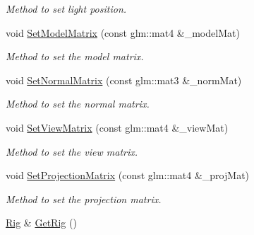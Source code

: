 \begin{DoxyCompactItemize}
\begin{DoxyCompactList}\small\item\em Method to set light position. \end{DoxyCompactList}\item 
void \hyperlink{classModel_a88d681e1ea367b0140b04ae84ee72512}{Set\+Model\+Matrix} (const glm\+::mat4 \&\+\_\+model\+Mat)\hypertarget{classModel_a88d681e1ea367b0140b04ae84ee72512}{}\label{classModel_a88d681e1ea367b0140b04ae84ee72512}

\begin{DoxyCompactList}\small\item\em Method to set the model matrix. \end{DoxyCompactList}\item 
void \hyperlink{classModel_a8cffd0fa41ec392fabaa02fce9f2624e}{Set\+Normal\+Matrix} (const glm\+::mat3 \&\+\_\+norm\+Mat)\hypertarget{classModel_a8cffd0fa41ec392fabaa02fce9f2624e}{}\label{classModel_a8cffd0fa41ec392fabaa02fce9f2624e}

\begin{DoxyCompactList}\small\item\em Method to set the normal matrix. \end{DoxyCompactList}\item 
void \hyperlink{classModel_aa98bb18be5df8aef0da8aa47d6e09f19}{Set\+View\+Matrix} (const glm\+::mat4 \&\+\_\+view\+Mat)\hypertarget{classModel_aa98bb18be5df8aef0da8aa47d6e09f19}{}\label{classModel_aa98bb18be5df8aef0da8aa47d6e09f19}

\begin{DoxyCompactList}\small\item\em Method to set the view matrix. \end{DoxyCompactList}\item 
void \hyperlink{classModel_aee6397055a5aa1e964cde1639da05122}{Set\+Projection\+Matrix} (const glm\+::mat4 \&\+\_\+proj\+Mat)\hypertarget{classModel_aee6397055a5aa1e964cde1639da05122}{}\label{classModel_aee6397055a5aa1e964cde1639da05122}

\begin{DoxyCompactList}\small\item\em Method to set the projection matrix. \end{DoxyCompactList}\item 
\hyperlink{classRig}{Rig} \& \hyperlink{classModel_ab41210858b52e222212ec2c9e4bfbed1}{Get\+Rig} ()\hypertarget{classModel_ab41210858b52e222212ec2c9e4bfbed1}{}\label{classModel_ab41210858b52e222212ec2c9e4bfbed1}


\end{DoxyCompactItemize}
